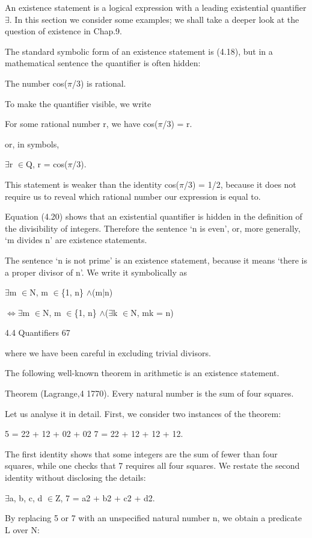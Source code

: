 \documentclass[11pt]{article}
\theoremstyle{plain}
\theoremstyle{definition}
\begin{document}
An existence statement is a logical expression with a leading existential quantifier $\exists$. In this section we consider some examples; we shall take a deeper look at the question of existence in Chap.9.

The standard symbolic form of an existence statement is (4.18), but in a mathematical sentence the quantifier is often hidden:

The number cos($\pi$/3) is rational.

To make the quantifier visible, we write

For some rational number r, we have cos($\pi$/3) = r.

or, in symbols,

$\exists$r $\in$Q, r = cos($\pi$/3).

This statement is weaker than the identity cos($\pi$/3) = 1/2, because it does not require us to reveal which rational number our expression is equal to.

Equation (4.20) shows that an existential quantifier is hidden in the definition of the divisibility of integers. Therefore the sentence `n is even', or, more generally, `m divides n' are existence statements.

The sentence `n is not prime' is an existence statement, because it means `there is a proper divisor of n'. We write it symbolically as

$\exists$m $\in$N, m $\in$\{1, n\} $\land$(m|n)

$\Leftrightarrow$$\exists$m $\in$N, m $\in$\{1, n\} $\land$($\exists$k $\in$N, mk = n)

4.4 Quantifiers 67

where we have been careful in excluding trivial divisors.

The following well-known theorem in arithmetic is an existence statement.

Theorem (Lagrange,4 1770). Every natural number is the sum of four squares.

Let us analyse it in detail. First, we consider two instances of the theorem:

5 = 22 + 12 + 02 + 02 7 = 22 + 12 + 12 + 12.

The first identity shows that some integers are the sum of fewer than four squares, while one checks that 7 requires all four squares. We restate the second identity without disclosing the details:

$\exists$a, b, c, d $\in$Z, 7 = a2 + b2 + c2 + d2.

By replacing 5 or 7 with an unspecified natural number n, we obtain a predicate L over N:
\end{document}
